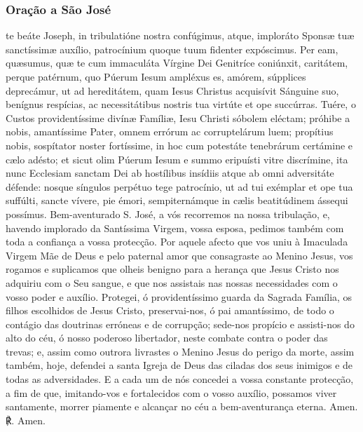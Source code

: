 \subsubsection{Oração a São José}
\begin{paracol}{2}
te beáte Joseph, in tribulatióne nostra confúgimus, atque, imploráto Sponsæ tuæ sanctíssimæ auxílio, patrocínium quoque tuum fidenter expóscimus. Per eam, quæsumus, quæ te cum immaculáta Vírgine Dei Genitríce coniúnxit, caritátem, perque patérnum, quo Púerum Iesum ampléxus es, amórem, súpplices deprecámur, ut ad hereditátem, quam Iesus Christus acquisívit Sánguine suo, benígnus respícias, ac necessitátibus nostris tua virtúte et ope succúrras. Tuére, o Custos providentíssime divínæ Famíliæ, Iesu Christi sóbolem eléctam; próhibe a nobis, amantíssime Pater, omnem errórum ac corruptelárum luem; propítius nobis, sospítator noster fortíssime, in hoc cum potestáte tenebrárum certámine e cælo adésto; et sicut olim Púerum Iesum e summo eripuísti vitre discrímine, ita nunc Ecclesiam sanctam Dei ab hostílibus insídiis atque ab omni adversitáte défende: nosque síngulos perpétuo tege patrocínio, ut ad tui exémplar et ope tua suffúlti, sancte vívere, pie émori, sempiternámque in cælis beatitúdinem ássequi possímus.
\switchcolumn
{}Bem-aventurado S. José, a vós recorremos na nossa tribulação, e, havendo implorado da Santíssima Virgem, vossa esposa, pedimos também com toda a confiança a vossa protecção. Por aquele afecto que vos uniu à Imaculada Virgem Mãe de Deus e pelo paternal amor que consagraste ao Menino Jesus, vos rogamos e suplicamos que olheis benigno para a herança que Jesus Cristo nos adquiriu com o Seu sangue, e que nos assistais nas nossas necessidades com o vosso poder e auxílio. Protegei, ó providentíssimo guarda da Sagrada Família, os filhos escolhidos de Jesus Cristo, preservai-nos, ó pai amantíssimo, de todo o contágio das doutrinas erróneas e de corrupção; sede-nos propício e assisti-nos do alto do céu, ó nosso poderoso libertador, neste combate contra o poder das trevas; e, assim como outrora livrastes o Menino Jesus do perigo da morte, assim também, hoje, defendei a santa Igreja de Deus das ciladas dos seus inimigos e de todas as adversidades. E a cada um de nós concedei a vossa constante protecção, a fim de que, imitando-vos e fortalecidos com o vosso auxílio, possamos viver santamente, morrer piamente e alcançar no céu a bem-aventurança eterna.
 Amen.
\switchcolumn
{\redx ℟.} Amen.
\end{paracol}

